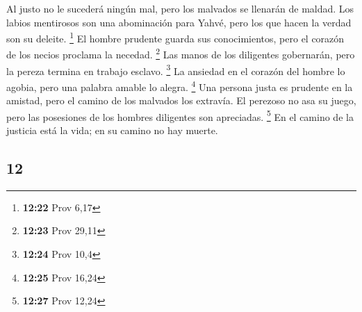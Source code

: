 \begin{paracol}{2}
 Al justo no le sucederá ningún mal, pero los malvados se
llenarán de maldad.  Los labios mentirosos son una
abominación para Yahvé, pero los que hacen la verdad son su deleite.
\footnote{\textbf{12:22} Prov 6,17}  El hombre prudente
guarda sus conocimientos, pero el corazón de los necios proclama la
necedad. \footnote{\textbf{12:23} Prov 29,11}  Las manos
de los diligentes gobernarán, pero la pereza termina en trabajo esclavo.
\footnote{\textbf{12:24} Prov 10,4}  La ansiedad en el
corazón del hombre lo agobia, pero una palabra amable lo alegra.
\footnote{\textbf{12:25} Prov 16,24}  Una persona justa
es prudente en la amistad, pero el camino de los malvados los extravía.
 El perezoso no asa su juego, pero las posesiones de los
hombres diligentes son apreciadas. \footnote{\textbf{12:27} Prov 12,24}
 En el camino de la justicia está la vida; en su camino
no hay muerte.

\switchcolumn
\begin{otherlanguage}{english}

\hypertarget{section-23}{%
\section{12}\label{section-23}}


\end{otherlanguage}
\end{paracol}
